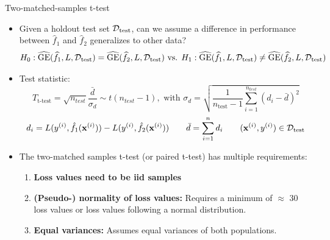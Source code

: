 \documentclass[11pt,compress,t,notes=noshow, aspectratio=169, xcolor=table]{beamer}
\begin{document}
\begin{frame}{Two-matched-samples t-test}

    
    
    \begin{itemize}
        \item Given a holdout test set $\mathcal{D}_{\text{test}}$, can we assume a difference in performance between $\widehat{f}_1$ and $\widehat{f}_2$ generalizes to other data?
        $$H_0: \widehat{\text{GE}}(\widehat{f}_1, L, \mathcal{D}_{\text{test}}) = \widehat{\text{GE}}(\widehat{f}_2, L, \mathcal{D}_{\text{test}}) \text{ vs. } H_1: \widehat{\text{GE}}(\widehat{f}_1, L, \mathcal{D}_{\text{test}}) \neq \widehat{\text{GE}}(\widehat{f}_2, L, \mathcal{D}_{\text{test}})$$
        \item Test statistic: 
            $$
            T_{\text{t-test}} = \sqrt{n_{test}} \frac{\bar{d}}{\sigma_{d}} \sim t(n_{test} - 1), \text{ with }
            \sigma_{d} = \sqrt{\frac{1}{n_{\text{test}} - 1}\sum_{i=1}^{n_{test}} \left(d_i - \bar{d} \right)^2}
        $$
        $$d_i = L(y^{(i)}, \hat{f}_1 (\mathbf{x}^{(i)})) - L(y^{(i)}, \hat{f}_2 (\mathbf{x}^{(i)}))\qquad \bar{d} = \sum\limits_{i=1}^{n} d_i \qquad (\mathbf{x}^{(i)}, y^{(i)}) \in \mathcal{D}_{\text{test}}$$
        \item The two-matched samples t-test (or paired t-test) has multiple requirements:
        \begin{enumerate}
            \item \textbf{Loss values need to be iid samples} %
            
            \item \textbf{(Pseudo-) normality of loss values:} 
            Requires a minimum of $\approx$ 30 loss values or loss values following a normal distribution.
            \item \textbf{Equal variances:} Assumes equal variances of both populations. %
        \end{enumerate}
    \end{itemize}
\end{frame}

    
\end{document}
